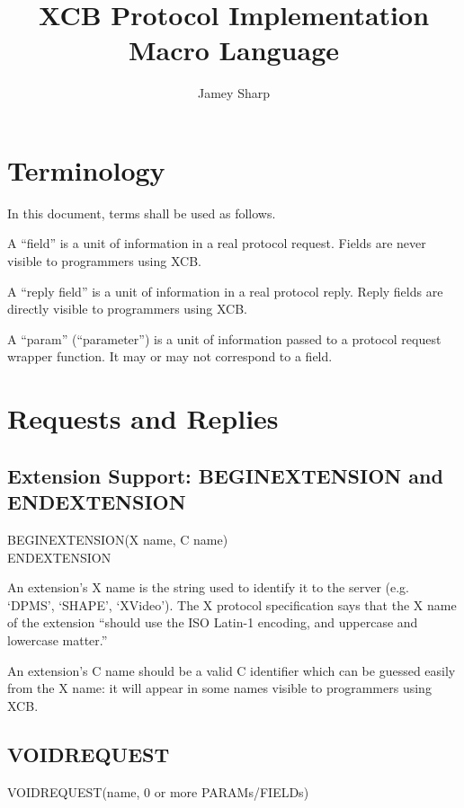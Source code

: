\documentclass{article}
\begin{document}
\title{XCB Protocol Implementation Macro Language}


\author{Jamey Sharp}

\maketitle

\section{Terminology}

In this document, terms shall be used as follows.

A ``field'' is a unit of information in a real protocol request. Fields
are never visible to programmers using XCB.

A ``reply field'' is a unit of information in a real protocol reply.
Reply fields are directly visible to programmers using XCB.

A ``param'' (``parameter'') is a unit of information passed to a protocol
request wrapper function. It may or may not correspond to a field.


\section{Requests and Replies}


\subsection{Extension Support: BEGINEXTENSION and ENDEXTENSION}

BEGINEXTENSION(X name, C name)\\
ENDEXTENSION

An extension's X name is the string used to identify it to the server
(e.g. `DPMS', `SHAPE', `XVideo'). The X protocol specification says that
the X name of the extension ``should use the ISO Latin-1 encoding, and
uppercase and lowercase matter.''

An extension's C name should be a valid C identifier which can be guessed
easily from the X name: it will appear in some names visible to
programmers using XCB.


\subsection{VOIDREQUEST}

VOIDREQUEST(name, 0 or more PARAMs/FIELDs)
\end{document}
